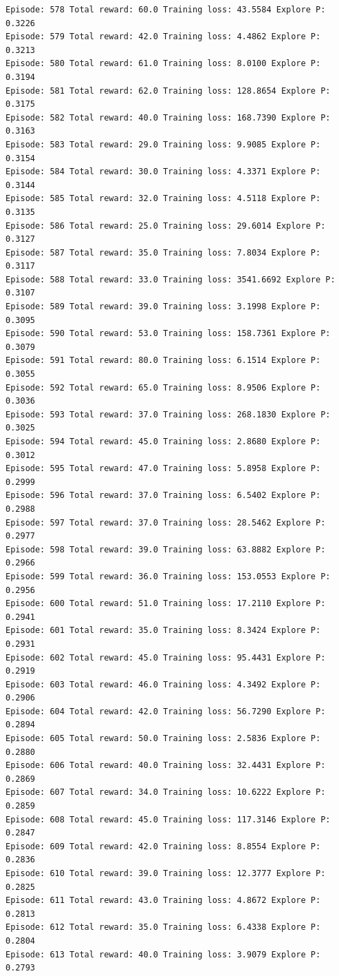 \documentclass[11pt]{article}
\begin{document}
\begin{Verbatim}[commandchars=\\\{\}]
Episode: 578 Total reward: 60.0 Training loss: 43.5584 Explore P: 0.3226
Episode: 579 Total reward: 42.0 Training loss: 4.4862 Explore P: 0.3213
Episode: 580 Total reward: 61.0 Training loss: 8.0100 Explore P: 0.3194
Episode: 581 Total reward: 62.0 Training loss: 128.8654 Explore P: 0.3175
Episode: 582 Total reward: 40.0 Training loss: 168.7390 Explore P: 0.3163
Episode: 583 Total reward: 29.0 Training loss: 9.9085 Explore P: 0.3154
Episode: 584 Total reward: 30.0 Training loss: 4.3371 Explore P: 0.3144
Episode: 585 Total reward: 32.0 Training loss: 4.5118 Explore P: 0.3135
Episode: 586 Total reward: 25.0 Training loss: 29.6014 Explore P: 0.3127
Episode: 587 Total reward: 35.0 Training loss: 7.8034 Explore P: 0.3117
Episode: 588 Total reward: 33.0 Training loss: 3541.6692 Explore P: 0.3107
Episode: 589 Total reward: 39.0 Training loss: 3.1998 Explore P: 0.3095
Episode: 590 Total reward: 53.0 Training loss: 158.7361 Explore P: 0.3079
Episode: 591 Total reward: 80.0 Training loss: 6.1514 Explore P: 0.3055
Episode: 592 Total reward: 65.0 Training loss: 8.9506 Explore P: 0.3036
Episode: 593 Total reward: 37.0 Training loss: 268.1830 Explore P: 0.3025
Episode: 594 Total reward: 45.0 Training loss: 2.8680 Explore P: 0.3012
Episode: 595 Total reward: 47.0 Training loss: 5.8958 Explore P: 0.2999
Episode: 596 Total reward: 37.0 Training loss: 6.5402 Explore P: 0.2988
Episode: 597 Total reward: 37.0 Training loss: 28.5462 Explore P: 0.2977
Episode: 598 Total reward: 39.0 Training loss: 63.8882 Explore P: 0.2966
Episode: 599 Total reward: 36.0 Training loss: 153.0553 Explore P: 0.2956
Episode: 600 Total reward: 51.0 Training loss: 17.2110 Explore P: 0.2941
Episode: 601 Total reward: 35.0 Training loss: 8.3424 Explore P: 0.2931
Episode: 602 Total reward: 45.0 Training loss: 95.4431 Explore P: 0.2919
Episode: 603 Total reward: 46.0 Training loss: 4.3492 Explore P: 0.2906
Episode: 604 Total reward: 42.0 Training loss: 56.7290 Explore P: 0.2894
Episode: 605 Total reward: 50.0 Training loss: 2.5836 Explore P: 0.2880
Episode: 606 Total reward: 40.0 Training loss: 32.4431 Explore P: 0.2869
Episode: 607 Total reward: 34.0 Training loss: 10.6222 Explore P: 0.2859
Episode: 608 Total reward: 45.0 Training loss: 117.3146 Explore P: 0.2847
Episode: 609 Total reward: 42.0 Training loss: 8.8554 Explore P: 0.2836
Episode: 610 Total reward: 39.0 Training loss: 12.3777 Explore P: 0.2825
Episode: 611 Total reward: 43.0 Training loss: 4.8672 Explore P: 0.2813
Episode: 612 Total reward: 35.0 Training loss: 6.4338 Explore P: 0.2804
Episode: 613 Total reward: 40.0 Training loss: 3.9079 Explore P: 0.2793

\end{Verbatim}
\end{document}
